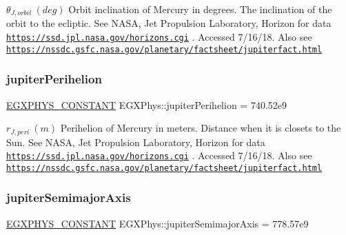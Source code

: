 $ \theta_{J,orbit} \ (deg)$ Orbit inclination of Mercury in degrees. The inclination of the orbit to the ecliptic. See N\+A\+SA, Jet Propulsion Laboratory, Horizon for data \href{https://ssd.jpl.nasa.gov/horizons.cgi}{\tt https\+://ssd.\+jpl.\+nasa.\+gov/horizons.\+cgi} . Accessed 7/16/18. Also see \href{https://nssdc.gsfc.nasa.gov/planetary/factsheet/jupiterfact.html}{\tt https\+://nssdc.\+gsfc.\+nasa.\+gov/planetary/factsheet/jupiterfact.\+html} \mbox{\label{group___e_g_x_phys-_constants-_astrophysics-_solar_system-_jupiter-_orbit_ga7eb6c0d478ae5c7ad6ae94bfcb9c47d9}} 
\subsubsection{\texorpdfstring{jupiter\+Perihelion}{jupiterPerihelion}}
{\footnotesize\ttfamily \mbox{\hyperlink{group___e_g_x_phys-_constants-_macros_ga76980d288494ce1714c9ac68a95ba702}{E\+G\+X\+P\+H\+Y\+S\+\_\+\+C\+O\+N\+S\+T\+A\+NT}} E\+G\+X\+Phys\+::jupiter\+Perihelion = 740.\+52e9}

$ r_{J,peri} \ (m)$ Perihelion of Mercury in meters. Distance when it is closets to the Sun. See N\+A\+SA, Jet Propulsion Laboratory, Horizon for data \href{https://ssd.jpl.nasa.gov/horizons.cgi}{\tt https\+://ssd.\+jpl.\+nasa.\+gov/horizons.\+cgi} . Accessed 7/16/18. Also see \href{https://nssdc.gsfc.nasa.gov/planetary/factsheet/jupiterfact.html}{\tt https\+://nssdc.\+gsfc.\+nasa.\+gov/planetary/factsheet/jupiterfact.\+html} \mbox{\label{group___e_g_x_phys-_constants-_astrophysics-_solar_system-_jupiter-_orbit_ga7cfafd3fa5a3ac5018c0be84dbb6600c}} 
\subsubsection{\texorpdfstring{jupiter\+Semimajor\+Axis}{jupiterSemimajorAxis}}
{\footnotesize\ttfamily \mbox{\hyperlink{group___e_g_x_phys-_constants-_macros_ga76980d288494ce1714c9ac68a95ba702}{E\+G\+X\+P\+H\+Y\+S\+\_\+\+C\+O\+N\+S\+T\+A\+NT}} E\+G\+X\+Phys\+::jupiter\+Semimajor\+Axis = 778.\+57e9}


